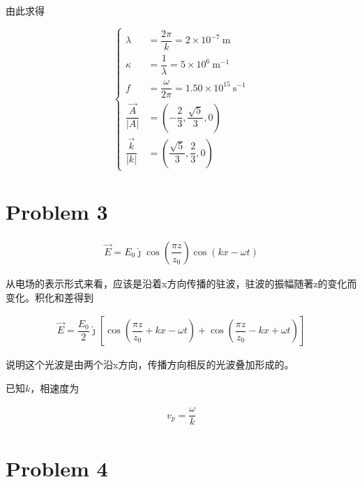 \documentclass{article}
\begin{document}
由此求得

\begin{equation*}
  \left\{
  \begin{aligned}
    \lambda &= \dfrac{2 \pi}{k} = 2 \times 10^{-7} \  \mathrm{m} \\
    \kappa &= \dfrac{1}{\lambda} = 5 \times 10^6 \  \mathrm{m^{-1}} \\
    f &= \dfrac{\omega}{2 \pi} = 1.50 \times 10^{15} \  \mathrm{s^{-1}} \\
    \dfrac{\vec{A}}{|A|} &= \left( - \dfrac{2}{3}, \dfrac{\sqrt{5}}{3}, 0   \right) \\
    \dfrac{\vec{k}}{|k|} &= \left( \dfrac{\sqrt{5}}{3}, \dfrac{2}{3},0   \right) 
  \end{aligned}
  \right.
\end{equation*}

\section{Problem 3}

\begin{equation*}
  \begin{aligned}
    \vec{E} = E_0 \hat{\jmath} \cos \left( \dfrac{\pi z}{z_0}  \right) \cos \left( k x - \omega t \right)
  \end{aligned}
\end{equation*}

从电场的表示形式来看，应该是沿着x方向传播的驻波，驻波的振幅随著z的变化而变化。积化和差得到

\begin{equation*}
  \begin{aligned}
    \vec{E} = \dfrac{E_0}{2}  \hat{\jmath} \left[ \cos \left( \dfrac{\pi z}{z_0} + k x - \omega t \right) + \cos \left( \dfrac{\pi z}{z_0} - k x + \omega t  \right) \right]
  \end{aligned}
\end{equation*}

说明这个光波是由两个沿x方向，传播方向相反的光波叠加形成的。

已知$k$，相速度为

\begin{equation*}
  \begin{aligned}
    v_p = \dfrac{\omega}{k} 
  \end{aligned}
\end{equation*}

\section{Problem 4}
\end{document}
